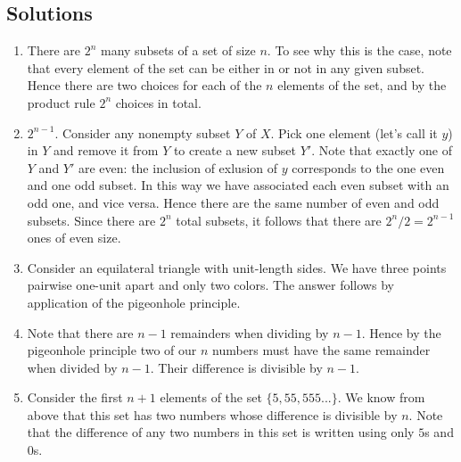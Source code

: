 \newpage
\begin{mdframed}[linewidth=1]
\section*{Solutions}
\begin{enumerate}
    \item There are $2^n$ many subsets of a set of size $n$. To see why this is the case, note that every element of the set can be either in or not in any given subset. Hence there are two choices for each of the $n$ elements of the set, and by the product rule $2^n$ choices in total. 

    \item $2^{n-1}$. Consider any nonempty subset $Y$ of $X$. Pick one element (let's call it $y$) in $Y$ and remove it from $Y$ to create a new subset $Y'$. Note that exactly one of $Y$ and $Y'$ are even: the inclusion of exlusion of $y$ corresponds to the one even and one odd subset. In this way we have associated each even subset with an odd one, and vice versa. Hence there are the same number of even and odd subsets. Since there are $2^n$ total subsets, it follows that there are $2^n/2 = 2^{n-1}$ ones of even size. 

    \item Consider an equilateral triangle with unit-length sides. We have three points pairwise one-unit apart and only two colors. The answer follows by application of the pigeonhole principle. 

    \item Note that there are $n - 1$ remainders when dividing by $n - 1$. Hence by the pigeonhole principle two of our $n$ numbers must have the same remainder when divided by $n - 1$. Their difference is divisible by $n - 1$. 

    \item Consider the first $n + 1$ elements of the set $\{5, 55, 555...\}$. We know from above that this set has two numbers whose difference is divisible by $n$. Note that the difference of any two numbers in this set is written using only $5$s and $0$s.

\end{enumerate}
\end{mdframed}